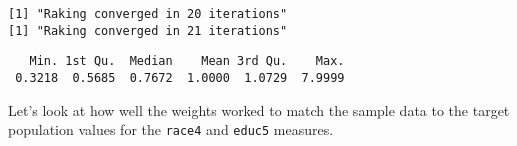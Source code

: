 \documentclass[
  letterpaper,
  DIV=11,
  numbers=noendperiod]{scrreprt}
\newenvironment{Shaded}{\begin{snugshade}}{\end{snugshade}}
\newcommand{\AttributeTok}[1]{\textcolor[rgb]{0.40,0.45,0.13}{#1}}
\newcommand{\DecValTok}[1]{\textcolor[rgb]{0.68,0.00,0.00}{#1}}
\newcommand{\FunctionTok}[1]{\textcolor[rgb]{0.28,0.35,0.67}{#1}}
\newcommand{\NormalTok}[1]{\textcolor[rgb]{0.00,0.23,0.31}{#1}}
\newcommand{\OtherTok}[1]{\textcolor[rgb]{0.00,0.23,0.31}{#1}}
\newcommand{\SpecialCharTok}[1]{\textcolor[rgb]{0.37,0.37,0.37}{#1}}
\newcommand{\StringTok}[1]{\textcolor[rgb]{0.13,0.47,0.30}{#1}}
\begin{document}
\begin{Shaded}
\end{Shaded}

\begin{verbatim}
[1] "Raking converged in 20 iterations"
[1] "Raking converged in 21 iterations"
\end{verbatim}

\begin{Shaded}
\end{Shaded}

\begin{verbatim}
   Min. 1st Qu.  Median    Mean 3rd Qu.    Max. 
 0.3218  0.5685  0.7672  1.0000  1.0729  7.9999 
\end{verbatim}

Let's look at how well the weights worked to match the sample data to
the target population values for the \texttt{race4} and \texttt{educ5}
measures.
\end{document}
